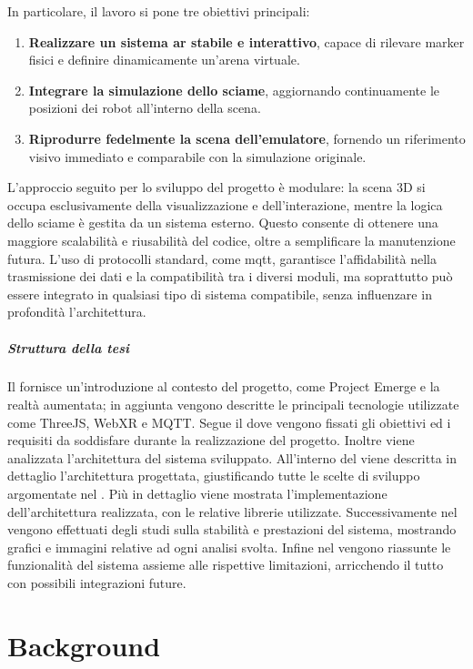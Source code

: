 \documentclass[12pt,a4paper,openright,oneside]{book}
\begin{document}
In particolare, il lavoro si pone tre obiettivi principali:
\begin{enumerate}
    \item \textbf{Realizzare un sistema \ac{ar} stabile e interattivo}, capace di rilevare marker fisici e definire dinamicamente un’arena virtuale.
    \item \textbf{Integrare la simulazione dello sciame}, aggiornando continuamente le posizioni dei robot all’interno della scena.
    \item \textbf{Riprodurre fedelmente la scena dell’emulatore}, fornendo un riferimento visivo immediato e comparabile con la simulazione originale.
\end{enumerate}
L’approccio seguito per lo sviluppo del progetto è modulare: la scena 3D si occupa esclusivamente della visualizzazione e dell’interazione, mentre la logica dello sciame è gestita da un sistema esterno.
Questo consente di ottenere una maggiore scalabilità e riusabilità del codice, oltre a semplificare la manutenzione futura.
L’uso di protocolli standard, come \ac{mqtt}, garantisce l'affidabilità nella trasmissione dei dati e la compatibilità tra i diversi moduli, ma soprattutto può essere integrato in qualsiasi tipo di sistema compatibile, senza influenzare in profondità l'architettura.
%
\paragraph{Struttura della tesi}
Il  fornisce un'introduzione al contesto del progetto, come Project Emerge e la realtà aumentata; in aggiunta vengono descritte le principali tecnologie utilizzate come ThreeJS, WebXR e MQTT.
Segue il  dove vengono fissati gli obiettivi ed i requisiti da soddisfare durante la realizzazione del progetto. Inoltre viene analizzata l'architettura del sistema sviluppato.
All'interno del  viene descritta in dettaglio l'architettura progettata, giustificando tutte le scelte di sviluppo argomentate nel . Più in dettaglio viene mostrata l'implementazione dell'architettura realizzata, con le relative librerie utilizzate.
Successivamente nel  vengono effettuati degli studi sulla stabilità e prestazioni del sistema, mostrando grafici e immagini relative ad ogni analisi svolta.
Infine nel  vengono riassunte le funzionalità del sistema assieme alle rispettive limitazioni, arricchendo il tutto con possibili integrazioni future.
%
\chapter{Background}\label{chap:background} %
%
\end{document}
